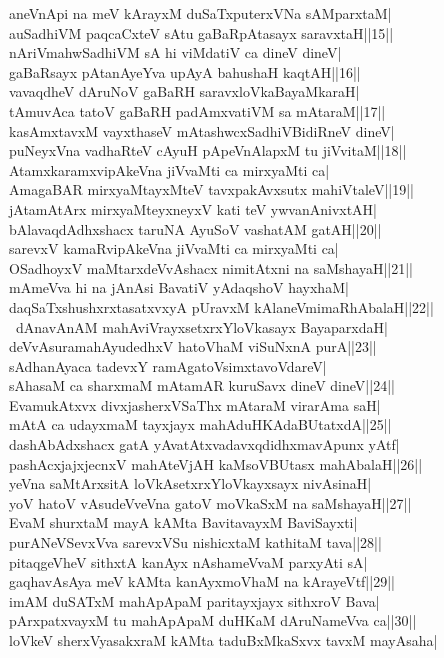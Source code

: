 \documentclass{article}
\begin{document}
aneVnApi na meV kArayxM duSaTxputerxVNa sAMparxtaM|\\
auSadhiVM paqcaCxteV sAtu gaBaRpAtasayx saravxtaH||15||\\
nAriVmahwSadhiVM sA hi viMdatiV ca dineV dineV|\\
gaBaRsayx pAtanAyeYva upAyA bahushaH kaqtAH||16||\\
vavaqdheV dAruNoV gaBaRH saravxloVkaBayaMkaraH|\\
tAmuvAca tatoV gaBaRH padAmxvatiVM sa mAtaraM||17||\\
kasAmxtavxM vayxthaseV mAtashwcxSadhiVBidiRneV dineV|\\
puNeyxVna vadhaRteV cAyuH pApeVnAlapxM tu jiVvitaM||18||\\
AtamxkaramxvipAkeVna jiVvaMti ca mirxyaMti ca|\\
AmagaBAR mirxyaMtayxMteV tavxpakAvxsutx mahiVtaleV||19||\\
jAtamAtArx mirxyaMteyxneyxV kati teV ywvanAnivxtAH|\\
bAlavaqdAdhxshacx taruNA AyuSoV vashatAM gatAH||20||\\
sarevxV kamaRvipAkeVna jiVvaMti ca mirxyaMti ca|\\
OSadhoyxV maMtarxdeVvAshacx nimitAtxni na saMshayaH||21||\\
mAmeVva hi na jAnAsi BavatiV yAdaqshoV hayxhaM|\\
daqSaTxshushxrxtasatxvxyA pUravxM kAlaneVmimaRhAbalaH||22||\\\
dAnavAnAM mahAviVrayxsetxrxYloVkasayx BayaparxdaH|\\
deVvAsuramahAyudedhxV hatoVhaM viSuNxnA purA||23||\\
sAdhanAyaca tadevxY ramAgatoVsimxtavoVdareV|\\
sAhasaM ca sharxmaM mAtamAR kuruSavx dineV dineV||24||\\
EvamukAtxvx divxjasherxVSaThx mAtaraM virarAma saH|\\
mAtA ca udayxmaM tayxjayx mahAduHKAdaBUtatxdA||25||\\
dashAbAdxshacx gatA yAvatAtxvadavxqdidhxmavApunx yAtf|\\
pashAcxjajxjecnxV mahAteVjAH kaMsoVBUtasx mahAbalaH||26||\\
yeVna saMtArxsitA loVkAsetxrxYloVkayxsayx nivAsinaH|\\
yoV hatoV vAsudeVveVna gatoV moVkaSxM na saMshayaH||27||\\
EvaM shurxtaM mayA kAMta BavitavayxM BaviSayxti|\\
purANeVSevxVva sarevxVSu nishicxtaM kathitaM tava||28||\\
pitaqgeVheV sithxtA kanAyx nAshameVvaM parxyAti sA|\\
gaqhavAsAya meV kAMta kanAyxmoVhaM na kArayeVtf||29||\\
imAM duSATxM mahApApaM paritayxjayx sithxroV Bava|\\
pArxpatxvayxM tu mahApApaM duHKaM dAruNameVva ca||30||\\
loVkeV sherxVyasakxraM kAMta taduBxMkaSxvx tavxM mayAsaha|\\
\end{document}
